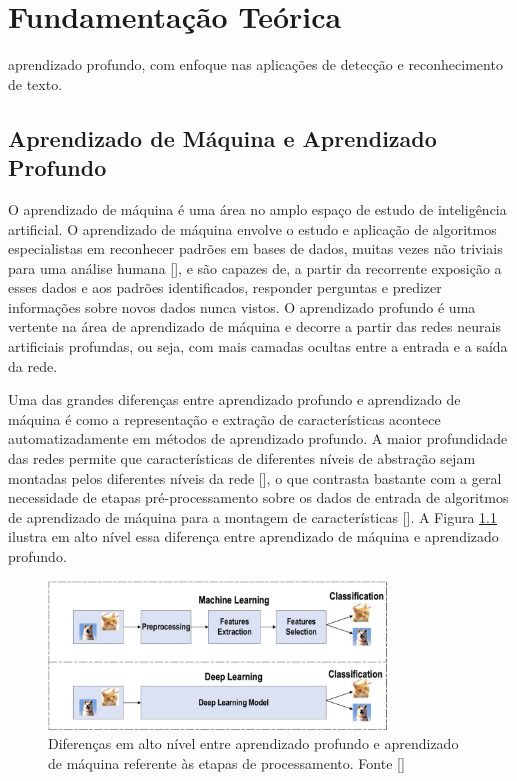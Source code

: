 \chapter{Fundamentação Teórica}

aprendizado profundo, com enfoque nas aplicações de detecção e reconhecimento de texto.

\section{Aprendizado de Máquina e Aprendizado Profundo}
O aprendizado de máquina é uma área no amplo espaço de estudo de inteligência artificial. O aprendizado de máquina 
envolve o estudo e aplicação de algoritmos especialistas em reconhecer padrões em bases de dados, muitas vezes não 
triviais para uma análise humana [], e são capazes de, a partir da recorrente exposição a 
esses dados e aos padrões identificados, responder perguntas e predizer informações sobre novos dados nunca vistos. 
O aprendizado profundo é uma vertente na área de aprendizado de máquina e decorre a partir das redes neurais artificiais 
profundas, ou seja, com mais camadas ocultas entre a entrada e a saída da rede.

Uma das grandes diferenças entre aprendizado profundo e aprendizado de máquina é como a representação e extração de 
características acontece automatizadamente em métodos de aprendizado profundo. A maior profundidade das redes permite 
que características de diferentes níveis de abstração sejam montadas pelos diferentes níveis da rede 
[], o que contrasta bastante com a geral necessidade de etapas pré-processamento sobre os 
dados de entrada de algoritmos de aprendizado de máquina para a montagem de características []. 
A Figura \ref{fig:dl_vs_ml} ilustra em alto nível essa diferença entre aprendizado de máquina e aprendizado profundo.

\begin{figure}
    \centering
    \includegraphics[width=0.8\textwidth]{figs/theory-ml-vs-dl.png}
    \caption{Diferenças em alto nível entre aprendizado profundo e aprendizado de máquina referente às etapas de processamento. Fonte []}
    \label{fig:dl_vs_ml}
\end{figure}

